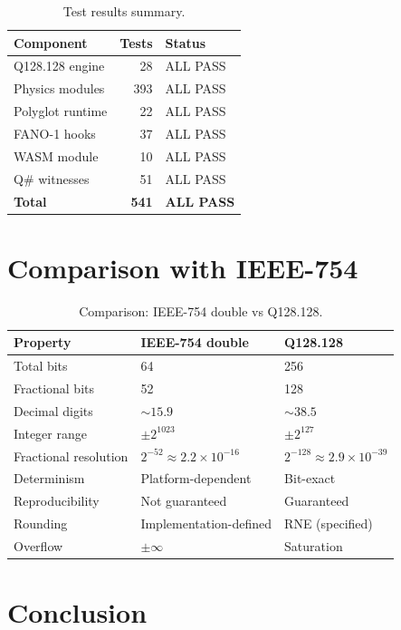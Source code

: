 \documentclass[11pt]{article}
\begin{document}
\begin{table}[ht]
\centering
\caption{Test results summary.}
\label{tab:tests}
\begin{tabular}{lrl}
\toprule
Component & Tests & Status \\
\midrule
Q128.128 engine & 28 & ALL PASS \\
Physics modules & 393 & ALL PASS \\
Polyglot runtime & 22 & ALL PASS \\
FANO-1 hooks & 37 & ALL PASS \\
WASM module & 10 & ALL PASS \\
Q\# witnesses & 51 & ALL PASS \\
\midrule
\textbf{Total} & \textbf{541} & \textbf{ALL PASS} \\
\bottomrule
\end{tabular}
\end{table}

\section{Comparison with IEEE-754}

\begin{table}[ht]
\centering
\caption{Comparison: IEEE-754 double vs Q128.128.}
\label{tab:comparison}
\begin{tabular}{lll}
\toprule
Property & IEEE-754 double & Q128.128 \\
\midrule
Total bits & 64 & 256 \\
Fractional bits & 52 & 128 \\
Decimal digits & $\sim 15.9$ & $\sim 38.5$ \\
Integer range & $\pm 2^{1023}$ & $\pm 2^{127}$ \\
Fractional resolution & $2^{-52} \approx 2.2 \times 10^{-16}$ & $2^{-128} \approx 2.9 \times 10^{-39}$ \\
Determinism & Platform-dependent & Bit-exact \\
Reproducibility & Not guaranteed & Guaranteed \\
Rounding & Implementation-defined & RNE (specified) \\
Overflow & $\pm \infty$ & Saturation \\
\bottomrule
\end{tabular}
\end{table}

\section{Conclusion}
\end{document}
